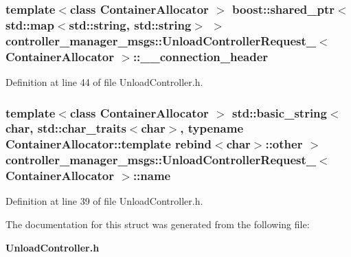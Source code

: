 \subsubsection[{\-\_\-\-\_\-connection\-\_\-header}]{\setlength{\rightskip}{0pt plus 5cm}template$<$class Container\-Allocator $>$ boost\-::shared\-\_\-ptr$<$std\-::map$<$std\-::string, std\-::string$>$ $>$ {\bf controller\-\_\-manager\-\_\-msgs\-::\-Unload\-Controller\-Request\-\_\-}$<$ \-Container\-Allocator $>$\-::{\bf \-\_\-\-\_\-connection\-\_\-header}}\label{structcontroller__manager__msgs_1_1UnloadControllerRequest___a9b9c58be881ef09e54cb341f8eb7dcc0}


\-Definition at line 44 of file \-Unload\-Controller.\-h.

\subsubsection[{name}]{\setlength{\rightskip}{0pt plus 5cm}template$<$class Container\-Allocator $>$ std\-::basic\-\_\-string$<$char, std\-::char\-\_\-traits$<$char$>$, typename \-Container\-Allocator\-::template rebind$<$char$>$\-::other $>$ {\bf controller\-\_\-manager\-\_\-msgs\-::\-Unload\-Controller\-Request\-\_\-}$<$ \-Container\-Allocator $>$\-::{\bf name}}\label{structcontroller__manager__msgs_1_1UnloadControllerRequest___a8bc64c4791aaf334a190e80234313c11}


\-Definition at line 39 of file \-Unload\-Controller.\-h.



\-The documentation for this struct was generated from the following file\-:\begin{DoxyCompactItemize}
\item 
{\bf \-Unload\-Controller.\-h}\end{DoxyCompactItemize}
